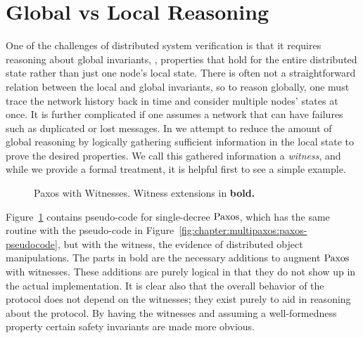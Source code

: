 \section{Global vs Local Reasoning}
\label{chapter:witnesspassing:sec:global-local-reasoning}

One of the challenges of distributed system verification is that it requires reasoning about
global invariants, \ie, properties that hold for the entire distributed state rather than just
one node's local state.
There is often not a straightforward relation between the local and global invariants, so
to reason globally, one must trace the network history back in time and consider multiple
nodes' states at once.
It is further complicated if one assumes a network that can have failures such as duplicated
or lost messages.
In \sysname{} we attempt to reduce the amount of global reasoning by logically gathering sufficient
information in the local state to prove the desired properties.
We call this gathered information a \textit{witness}, and while we provide a formal treatment, it is helpful first to see a simple example.

\begin{figure}
\begin{minipage}{\linewidth}
\noindent
\begin{multicols}{2}
  
\end{multicols}
\end{minipage}
\caption{Paxos with Witnesses. Witness extensions in \bfseries{bold}.}
\label{fig:chapter:witnesspassing:paxos-witness}
\end{figure}

Figure~\ref{fig:chapter:witnesspassing:paxos-witness} contains pseudo-code for single-decree $\mathrm{Paxos}$,
which has the same routine with the pseudo-code in Figure~\ref{fig:chapter:multipaxos:paxos-pseudocode},
but with the witness, the evidence of distributed object manipulations.
The parts in bold are the necessary additions to augment $\mathrm{Paxos}$ with witnesses.
These additions are purely logical in that they do not show up in the actual implementation.
It is clear also that the overall behavior of the protocol does not depend on the witnesses;
they exist purely to aid in reasoning about the protocol.
By having the witnesses and assuming a well-formedness property certain safety invariants are
made more obvious.

